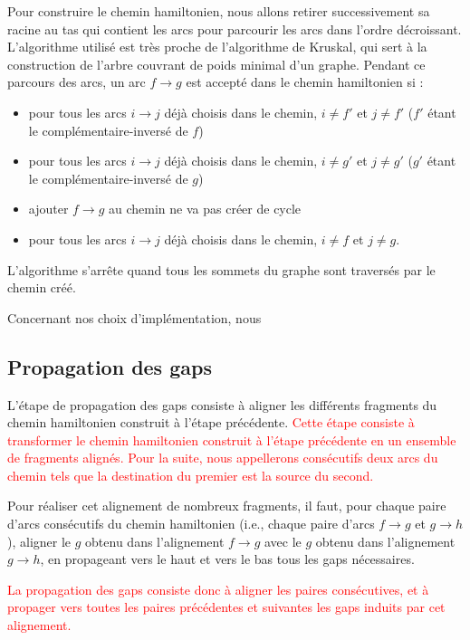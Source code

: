 \documentclass{article}
\begin{document}
Pour construire le chemin hamiltonien, nous allons retirer successivement sa racine au tas qui contient les arcs pour parcourir les arcs dans l'ordre décroissant. L'algorithme utilisé est très proche de l'algorithme de Kruskal, qui sert à la construction de l'arbre couvrant de poids minimal d'un graphe.
Pendant ce parcours des arcs, un arc $f \to g$ est accepté dans le chemin hamiltonien si :

\begin{itemize}
\item pour tous les arcs $i \to j$ déjà choisis dans le chemin, $i \neq f'$ et $j \neq f'$  ($f'$ étant le complémentaire-inversé de $f$)
\item pour tous les arcs $i \to j$ déjà choisis dans le chemin, $i \neq g'$ et $j \neq g'$  ($g'$ étant le complémentaire-inversé de $g$)
\item ajouter $f \to g$ au chemin ne va pas créer de cycle
\item pour tous les arcs $i \to j$ déjà choisis dans le chemin, $i \neq f$ et $j \neq g$.
\end{itemize}

L'algorithme s'arrête quand tous les sommets du graphe sont traversés par le chemin créé.

Concernant nos choix d'implémentation, nous 

\subsection{Propagation des gaps}

L'étape de propagation des gaps consiste à aligner les différents fragments du chemin hamiltonien construit à l'étape précédente.
\textcolor{red}{
Cette étape consiste à transformer le chemin hamiltonien construit à l'étape précédente en un ensemble de fragments alignés. Pour la suite, nous appellerons consécutifs deux arcs du chemin tels que la destination du premier est la source du second.}

Pour réaliser cet alignement de nombreux fragments, il faut, pour chaque paire d'arcs consécutifs du chemin hamiltonien (i.e., chaque paire d'arcs $f \to g$ et $g \to h$), aligner le $g$ obtenu dans l'alignement $f \to g$ avec le $g$ obtenu dans l'alignement $g \to h$, en propageant vers le haut et vers le bas tous les gaps nécessaires.

\textcolor{red}{
La propagation des gaps consiste donc à aligner les paires consécutives, et à propager vers toutes les paires précédentes et suivantes les gaps induits par cet alignement.}
\end{document}
